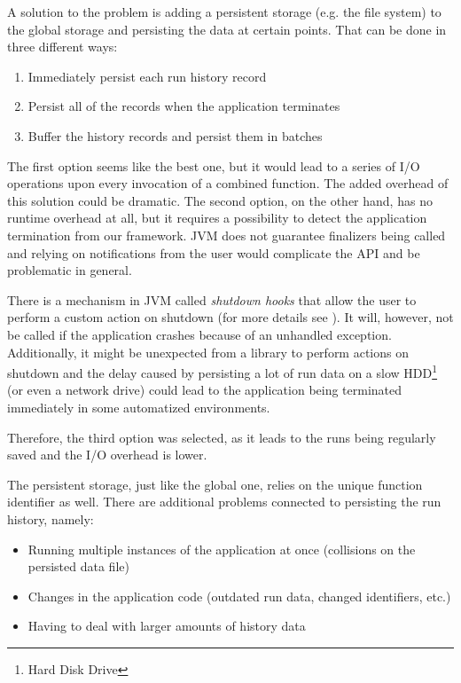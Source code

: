 A solution to the problem is adding a persistent storage (e.g. the file system) to the global storage and persisting the data at certain points. That can be done in three different ways:

\begin{enumerate}
	\item Immediately persist each run history record
	\item Persist all of the records when the application terminates
	\item Buffer the history records and persist them in batches
\end{enumerate}

The first option seems like the best one, but it would lead to a series of I/O operations upon every invocation of a combined function. The added overhead of this solution could be dramatic. The second option, on the other hand, has no runtime overhead at all, but it requires a possibility to detect the application termination from our framework. JVM does not guarantee finalizers being called and relying on notifications from the user would complicate the API and be problematic in general. 

There is a mechanism in JVM called \textit{shutdown hooks} that allow the user to perform a custom action on shutdown (for more details see \cite{noauthor_jvmshuthooks_nodate}). It will, however, not be called if the application crashes because of an unhandled exception. Additionally, it might be unexpected from a library to perform actions on shutdown and the delay caused by persisting a lot of run data on a slow HDD\footnote{Hard Disk Drive} (or even a network drive) could lead to the application being terminated immediately in some automatized environments.

Therefore, the third option was selected, as it leads to the runs being regularly saved and the I/O overhead is lower.

The persistent storage, just like the global one, relies on the unique function identifier as well. There are additional problems connected to persisting the run history, namely:
\begin{itemize}
	\item Running multiple instances of the application at once (collisions on the persisted data file)
	\item Changes in the application code (outdated run data, changed identifiers, etc.)
	\item Having to deal with larger amounts of history data
\end{itemize}

